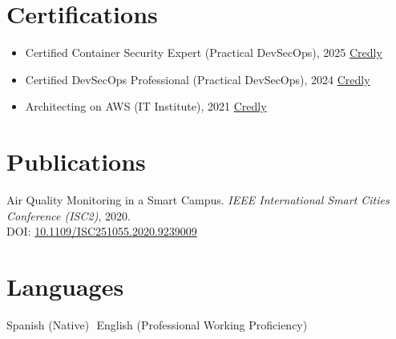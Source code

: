 \documentclass[11pt,a4paper]{article}
\newcommand{\sep}{\,\textbar\,}
\begin{document}
\section*{Certifications}
\begin{itemize}
  \item Certified Container Security Expert (Practical DevSecOps), 2025 \hfill \href{https://www.credly.com/badges/f84b8130-c4e0-4e3f-b8ff-2dc04cc5b40b/public_url}{Credly}
  \item Certified DevSecOps Professional (Practical DevSecOps), 2024 \hfill \href{https://www.credly.com/badges/b6ffc094-a1c5-4e28-b08e-192769fa2206/public_url}{Credly}
  \item Architecting on AWS (IT Institute), 2021 \hfill \href{https://www.credly.com/badges/cafb146b-ed0d-4de2-bd07-8628481f3347/public_url}{Credly}
\end{itemize}

\section*{Publications}
Air Quality Monitoring in a Smart Campus. \emph{IEEE International Smart Cities Conference (ISC2)}, 2020.\\
DOI: \href{https://doi.org/10.1109/ISC251055.2020.9239009}{10.1109/ISC251055.2020.9239009}

\section*{Languages}
Spanish (Native) \sep English (Professional Working Proficiency)
\end{document}
